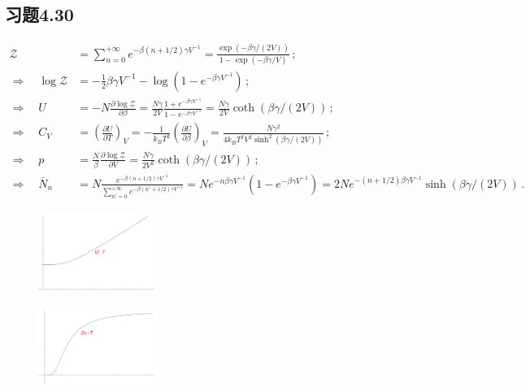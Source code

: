 \documentclass[letterpaper, 10pt]{article}
\begin{document}
\subsection{习题4.30}
\begin{align*}
\mathcal{Z} & = \sum_{n=0}^{+\infty} e^{-\beta(n+1/2)\gamma V^{-1}} = \frac{\exp{(-\beta\gamma/(2V))}}{1-\exp{(-\beta\gamma/V)}} \,; \\
\Rightarrow \quad{} \log{\mathcal{Z}} & = -\frac{1}{2} \beta\gamma V^{-1} - \log{\left(1-e^{-\beta\gamma V^{-1}}\right)} \,; \\
\Rightarrow \quad{} U & = - N \frac{\partial \log\mathcal{Z}}{\partial \beta} = \frac{N\gamma}{2V} \frac{1+e^{-\beta\gamma V^{-1}}}{1-e^{-\beta\gamma V^{-1}}} = \frac{N\gamma}{2V} \coth{(\beta\gamma/(2V))} \,; \\
\Rightarrow \quad{} C_{V} & = \left(\frac{\partial U}{\partial T}\right)_{V} = -\frac{1}{k_{B}T^{2}} \left(\frac{\partial U}{\partial \beta}\right)_{V} = \frac{N\gamma^{2}}{4k_{B}T^{2}V^{2}\sinh^{2}{(\beta\gamma/(2V))}} \,; \\
\Rightarrow \quad{} p & = \frac{N}{\beta} \frac{\partial \log\mathcal{Z}}{\partial V} = \frac{N\gamma}{2V^{2}} \coth{(\beta\gamma/(2V))} \,; \\
\Rightarrow \quad{} \bar{N}_{n} & = N \frac{e^{-\beta(n+1/2)\gamma V^{-1}}}{\sum_{n'=0}^{+\infty} e^{-\beta(n'+1/2)\gamma V^{-1}}} = N e^{-n\beta\gamma V^{-1}} \left( 1- e^{-\beta\gamma V^{-1}} \right) = 2 N e^{-(n+1/2)\beta\gamma V^{-1}} \sinh{(\beta\gamma/(2V))}\,.
\end{align*}
\begin{figure}[htbp]
\centering
\includegraphics[width=0.35\textwidth]{ut}
\end{figure}
\begin{figure}[htbp]
\centering
\includegraphics[width=0.35\textwidth]{cvt}
\end{figure}
\end{document}
